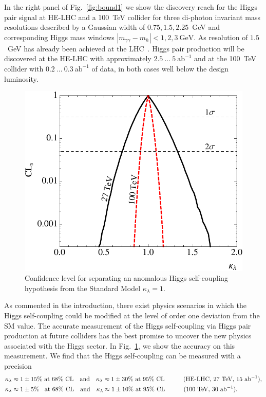 In the right panel of Fig.~\ref{fig:bound1} we show the discovery reach for the Higgs pair signal at HE-LHC and a 100~TeV collider for three di-photon invariant mass resolutions described by a Gaussian width of 
$0.75,1.5,2.25$~GeV and corresponding Higgs mass windows 
$|m_{\gamma\gamma}-m_h|<1,2,3~\text{GeV}$. As resolution of $1.5$~GeV 
has already been achieved at the LHC~\cite{CMS:2016zjv}. Higgs pair 
production will be discovered at the HE-LHC with approximately 
$2.5~...~5~\text{ab}^{-1}$ and at the 100~TeV collider with $0.2~...~0.3~\text{ab}^{-1}$ of data, in both cases well below the design luminosity.

\begin{figure}[t!]
\centering 
  \includegraphics[width=.4\textwidth]{section3/plots/hh_dlamb}
  \caption{Confidence level for separating an anomalous Higgs
    self-coupling hypothesis from the Standard Model
    $\kappa_{\lambda}=1$.}
 \label{fig:bound2}
\end{figure}

As commented in the introduction, there exist physics scenarios in which the Higgs self-coupling could be modified at the level of order one deviation from the SM value. The accurate measurement of the Higgs self-coupling via Higgs pair production at future colliders has the best promise to uncover the new physics associated with the Higgs sector. In Fig.~\ref{fig:bound2}, we show the accuracy on this measurement. We find that the Higgs self-coupling can be measured with a precision
% 
\begin{align}
\kappa_{\lambda} &\approx 1 \pm 15\% \text{    at 68\% CL}\quad \text{and} \quad
\kappa_{\lambda} \approx 1 \pm 30\%   \text{    at 95\% CL}\quad\quad\quad
\text{(HE-LHC, 27~TeV, $15~\text{ab}^{-1}$)}  , \notag \\
\kappa_{\lambda} &\approx 1 \pm 5\% \;\; \text{    at 68\% CL}\quad \text{and}\quad
\kappa_{\lambda} \approx 1 \pm 10\% \text{    at 95\% CL} \quad\quad\quad
\text{(100~TeV, $30~\text{ab}^{-1}$).} 
\end{align}

